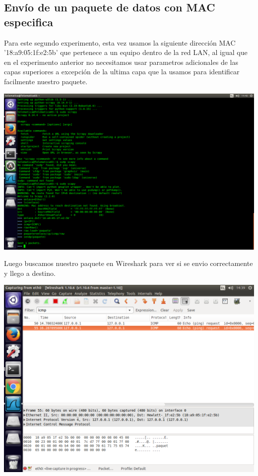 ﻿\documentclass[spanish]{udpreport}
\begin{document}



\subsection{Envío de un paquete de datos con MAC especifica}

Para este segundo experimento, esta vez usamos la siguiente dirección MAC '18:a9:05:1f:e2:5b' que pertenece a un equipo dentro de la red LAN, al igual que en el experimento anterior no necesitamos usar parametros adicionales de las capas superiores a excepción de la ultima capa que la usamos para identificar facilmente nuestro paquete.

\begin{center}
	\includegraphics[scale=.37]{imagenes/Switch/Test_2.png}
\end{center}

Luego buscamos nuestro paquete en Wireshark para ver si se envio correctamente y llego a destino.

\begin{center}
	\includegraphics[scale=.37]{imagenes/Switch/Test_2_Wireshark.png}
\end{center}
\end{document}
